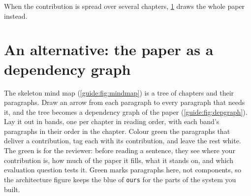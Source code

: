 When the contribution is spread over several chapters, \cref{guide:writing:depgraph} draws the whole paper instead.

\section{An alternative: the paper as a dependency graph}\label{guide:writing:depgraph}
The skeleton mind map (\cref{guide:fig:mindmap}) is a tree of chapters and their paragraphs. Draw an arrow from each paragraph to every paragraph that needs it, and the tree becomes a dependency graph of the paper (\cref{guide:fig:depgraph}). Lay it out in bands, one per chapter in reading order, with each band's paragraphs in their order in the chapter. Colour green the paragraphs that deliver a contribution, tag each with its contribution, and leave the rest white. The green is for the reviewer: before reading a sentence, they see where your contribution is, how much of the paper it fills, what it stands on, and which evaluation question tests it. Green marks paragraphs here, not components, so the architecture figure keeps the blue of \texttt{ours} for the parts of the system you built.

